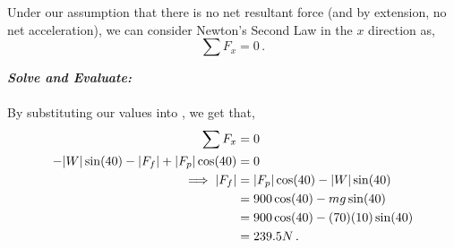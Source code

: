 \begin{subquestions}
\begin{subsubquestions}
Under our assumption that there is no net resultant force (and by extension, no net acceleration), we can consider Newton's Second Law in the $x$ direction as,
\begin{equation}
	\sum F_x = 0 \,. \label{2011:q6:Newt1}
\end{equation}




\textbf{\textit{Solve and Evaluate:}} \\ \\
By substituting our values into , we get that,
\begin{align}
	\sum F_x & = 0 \nonumber \\
	-|W|\sin(40)-|F_f|+|F_p|\cos(40) & = 0 \nonumber \\
	\implies |F_f| & = |F_p|\cos(40)-|W|\sin(40) \nonumber \\
	               & = 900\cos(40)-mg\sin(40) \nonumber \\
	               & = 900\cos(40)-(70)(10)\sin(40) \nonumber \\
	               & = 239.5N \,.
\end{align}

\end{subsubquestions}
	
	
	
	
\end{subquestions}





















